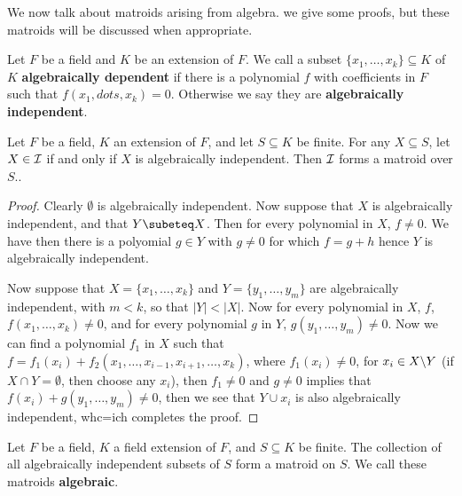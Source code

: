 We now talk about matroids arising from algebra. we give some proofs, but these matroids will be
discussed when appropriate.

\begin{definition}
    Let $F$ be a field and  $K$ be an extension of $F$. We call a subset  $\{x_1, \dots, x_k\}
    \subseteq K$ of $K$ \textbf {algebraically dependent} if there is a polynomial $f$ with
    coefficients in  $F$ such that  $f(x_1, dots, x_k)=0$. Otherwise we say they are \textbf
    {algebraically independent}.
\end{definition}

\begin{theorem}\label{1.2.5}
    Let $F$ be a field,  $K$ an extension of  $F$, and let  $S \subseteq K$ be finite.  For any $X
    \subseteq S$, let  $X \in \mathcal{I}$ if and only if  $X$ is algebraically independent. Then  $\mathcal{I}$
    forms a matroid over  $S$..
\end{theorem}
\begin{proof}
    Clearly $\emptyset$ is algebraically independent. Now suppose that $X$
    is algebraically independent, and that  $Y \subeteq X$. Then for every polynomial 
    in $X$, $f \neq 0$. We have then there is a polyomial $g \in Y$ with $g \neq 0$ for which
     $f=g+h$ hence $Y$ is algebraically independent.

     Now suppose that $X=\{x_1, \dots, x_k\}$ and $Y=\{y_1, \dots, y_m\}$ are algebraically
     independent, with $m<k$, so that  $|Y|<|X|$. Now for every polynomial in $X$, $f$, $f(x_1,
     \dots, x_k) \neq 0$, and for every polynomial $g$ in  $Y$,  $g(y_1, \dots, y_m) \neq 0$. Now we
     can find a polynomial $ f_1$ in $X$ such that  $f=f_1(x_i)+f_2(x_1, \dots, x_{i-1},x_{i+1},
     \dots, x_k)$, where $ f_1(x_i) \neq 0$, for $x_i \in X\backslash Y$ (if $X \cap Y=\emptyset$, then
     choose any  $x_i$), then $f_1 \neq 0$ and $g \neq 0$ implies that  $f(x_i)+g(y_1, \dots, y_m)
     \neq 0$, then we see that $Y \cup x_i$ is also algebraically independent, whc=ich completes the
     proof.
\end{proof}

\begin{definition}
    Let $F$ be a field,  $K$ a field extension of  $F$, and  $S \subseteq K$ be finite. The
    collection of all algebraically independent subsets of  $S$ form a matroid on  $S$. We call
    these matroids \textbf {algebraic}.		
\end{definition}

